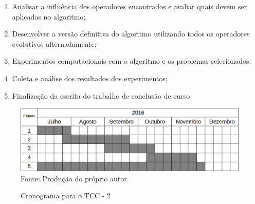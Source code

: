 \begin{enumerate}
\item Analisar a influência dos operadores encontrados e avaliar quais devem ser aplicados no algoritmo;
\item Desenvolver a versão definitiva do algoritmo utilizando todos os operadores evolutivos alternadamente;
\item Experimentos computacionais com o algoritmo e os problemas selecionados;
\item Coleta e análise dos resultados dos experimentos; 
\item Finalização da escrita do trabalho de conclusão de curso
\end{enumerate}

\begin{figure}[!htb]
	\caption{Cronograma para o TCC - 2}
	\centering
	\includegraphics[scale=0.5]{images/cronograma.png}
	\label{fig:cronograma}{\\Fonte: Produção do próprio autor.}
\end{figure}

